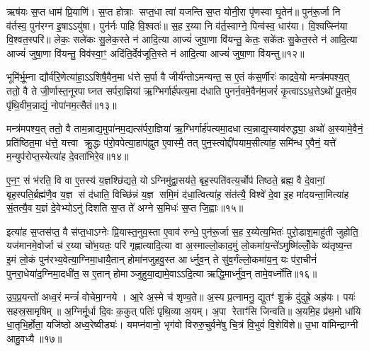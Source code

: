 ऋष॑यः स॒प्त धाम॑ प्रि॒याणि॑। स॒प्त होत्राः सप्त॒धा त्वा॑ यजन्ति स॒प्त योनी॒रा पृ॑णस्वा घृ॒तेन॑॥ पुन॑रू॒र्जा नि व॑र्तस्व॒ पुन॑रग्न इ॒षाऽऽयु॑षा। पुन॑र्नः पाहि वि॒श्वतः॑॥ स॒ह र॒य्या नि व॑र्त॒स्वाग्ने॒ पिन्व॑स्व॒ धार॑या। वि॒श्वप्स्नि॑या वि॒श्वत॒स्परि॑॥ लेकः॒ सले॑कः सु॒लेक॒स्ते न॑ आदि॒त्या आज्यं॑ जुषा॒णा वि॑यन्तु॒ केतः॒ सके॑तः सु॒केत॒स्ते न॑ आदि॒त्या आज्यं॑ जुषा॒णा वि॑यन्तु॒ विव॑स्वा॒ꣳ॒ अदि॑ति॒र्देव॑जूति॒स्ते न॑ आदि॒त्या आज्यं॑ जुषा॒णा वि॑यन्तु॥१२॥

{\anuvakamend[{त्वा॒ जि॒ह्वाः स॒प्त सु॒केत॒स्ते न॒स्त्रयो॑दश च॥३॥}]}

भूमि॑र्भू॒म्ना द्यौर्व॑रि॒णेत्या॑हा॒ऽऽशिषै॒वैन॒मा ध॑त्ते स॒र्पा वै जीर्य॑न्तोऽमन्यन्त॒ स ए॒तं क॑स॒र्णीरः॑ काद्रवे॒यो मन्त्र॑मपश्य॒त् ततो॒ वै ते जी॒र्णास्त॒नूरपाघ्नत सर्परा॒ज्ञिया॑ ऋ॒ग्भिर्गार्\mbox{}ह॑पत्य॒मा द॑धाति पुनर्न॒वमे॒वैन॑म॒जरं॑ कृ॒त्वाऽऽध॒त्तेऽथो॑ पू॒तमे॒व पृ॑थि॒वीम॒न्नाद्यं॒ नोपा॑नम॒त्सैतं॥१३॥

मन्त्र॑मपश्य॒त् ततो॒ वै ताम॒न्नाद्य॒मुपा॑नम॒द्यत्स॑र्परा॒ज्ञिया॑ ऋ॒ग्भिर्गार्\mbox{}ह॑पत्यमा॒दधात्य॒न्नाद्य॒स्याव॑रुद्ध्या॒ अथो॑ अ॒स्यामे॒वैनं॒ प्रति॑ष्ठित॒मा ध॑त्ते॒ यत्त्वा क्रु॒द्धः प॑रो॒वपेत्या॒हाप॑ह्नुत ए॒वास्मै॒ तत् पुन॒स्त्वोद्दी॑पयाम॒सीत्या॑ह॒ समि॑न्ध ए॒वैनं॒ यत्ते॑ म॒न्युप॑रोप्त॒स्येत्या॑ह दे॒वता॑भिरे॒व॥१४॥

ए॒न॒ꣳ॒ सं भ॑रति॒ वि वा ए॒तस्य॑ य॒ज्ञश्छि॑द्यते॒ योऽग्निमु॑द्वा॒सय॑ते॒ बृह॒स्पति॑वत्य॒र्चोप॑ तिष्ठते॒ ब्रह्म॒ वै दे॒वानां॒ बृह॒स्पति॒र्ब्रह्म॑णै॒व य॒ज्ञ सं द॑धाति॒ विच्छि॑न्नं य॒ज्ञ समि॒मं द॑धा॒त्वित्या॑ह॒ संत॑त्यै॒ विश्वे॑ दे॒वा इ॒ह मा॑दयन्ता॒मित्या॑ह सं॒तत्यै॒व य॒ज्ञं दे॒वेभ्योऽनु॑ दिशति स॒प्त ते॑ अग्ने स॒मिधः॑ स॒प्त जि॒ह्वाः॥१५॥

इत्या॑ह स॒प्तस॑प्त॒ वै स॑प्त॒धाऽग्नेः प्रि॒यास्त॒नुव॒स्ता ए॒वाव॑ रुन्धे॒ पुन॑रू॒र्जा स॒ह र॒य्येत्य॒भितः॑ पुरो॒डाश॒माहु॑ती जुहोति॒ यज॑मानमे॒वोर्जा च॑ र॒य्या चो॑भ॒यतः॒ परि॑ गृह्णात्यादि॒त्या वा अ॒स्माल्लो॒काद॒मुं लो॒कमा॑य॒न्ते॑ऽमुष्मि॑ल्लोँ॒के व्य॑तृष्य॒न्त इ॒मं लो॒कं पुन॑रभ्य॒वेत्या॒ग्निमा॒धायै॒तान् होमा॑नजुहवु॒स्त आर्ध्नुव॒न् ते सु॑व॒र्गंल्लो॒कमा॑य॒न्॒ यः प॑रा॒चीनं॑ पुनरा॒धेया॑द॒ग्निमा॒दधी॑त॒ स ए॒तान् होमाञ्जुहुया॒द्यामे॒वाऽऽदि॒त्या ऋद्धि॒मार्ध्नु॑व॒न् तामे॒वर्ध्नो॑ति॥१६॥

{\anuvakamend[{ए॒तमे॒व जि॒ह्वा ए॒तान् पञ्च॑विशतिश्च॥४॥}]}

उ॒प॒प्र॒यन्तो॑ अध्व॒रं मन्त्रं॑ वोचेमा॒ग्नये। आ॒रे अ॒स्मे च॑ शृण्व॒ते॥ अ॒स्य प्र॒त्नामनु॒ द्युतꣳ॑ शु॒क्रं दु॑दुह्रे॒ अह्र॑यः। पयः॑ सहस्र॒सामृषिम्॥ अ॒ग्निर्मू॒र्धा दि॒वः क॒कुत् पतिः॑ पृथि॒व्या अ॒यम्। अ॒पा रेताꣳ॑सि जिन्वति॥ अ॒यमि॒ह प्र॑थ॒मो धा॑यि धा॒तृभि॒र्\mbox{}होता॒ यजि॑ष्ठो अध्व॒रेष्वीड्यः॑। यमप्न॑वानो॒ भृग॑वो विरुरु॒चुर्वने॑षु चि॒त्रं वि॒भुवं॑ वि॒शेवि॑शे॥ उ॒भा वा॑मिन्द्राग्नी आहु॒वध्यै॥१७॥

